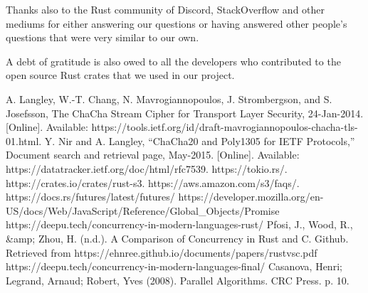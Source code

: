 \documentclass[conference]{IEEEtran}
\begin{document}
Thanks also to the Rust community of Discord, StackOverflow
and other mediums for either answering our questions or having
answered other people's questions that were very similar to our own.

A debt of gratitude is also owed to all the developers who contributed
to the open source Rust crates that we used in our project.


\begin{thebibliography}{00}
 A. Langley, W.-T. Chang, N. Mavrogiannopoulos, J. Strombergson, and S. Josefsson, The ChaCha Stream Cipher for Transport Layer Security, 24-Jan-2014. [Online]. Available: https://tools.ietf.org/id/draft-mavrogiannopoulos-chacha-tls-01.html.
 Y. Nir and A. Langley, “ChaCha20 and Poly1305 for IETF Protocols,” Document search and retrieval page, May-2015. [Online]. Available: https://datatracker.ietf.org/doc/html/rfc7539.
 https://tokio.rs/.
 https://crates.io/crates/rust-s3.
 https://aws.amazon.com/s3/faqs/.
 https://docs.rs/futures/latest/futures/
 https://developer.mozilla.org/en-US/docs/Web/JavaScript/Reference/Global\_Objects/Promise
 https://deepu.tech/concurrency-in-modern-languages-rust/
 Pfosi, J., Wood, R., &amp; Zhou, H. (n.d.). A Comparison of Concurrency in Rust and C. Github. 
Retrieved from https://ehnree.github.io/documents/papers/rustvsc.pdf 
 https://deepu.tech/concurrency-in-modern-languages-final/
 Casanova, Henri; Legrand, Arnaud; Robert, Yves (2008). Parallel Algorithms. CRC Press. p. 10.

\end{thebibliography}
\vspace{12pt}
\end{document}
